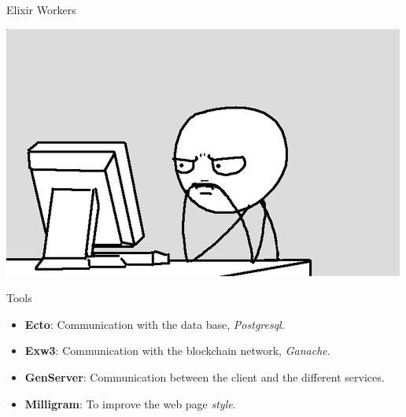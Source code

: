 \documentclass{beamer}
\begin{document}
\begin{frame}{Elixir Workers}
  \begin{center}
  \includegraphics[scale=0.5]{Images/worker.png}
  \end{center}
\end{frame}


\begin{frame}{Tools}
  \begin{itemize}
    \item \textbf{Ecto}: Communication with the data base, \textit{Postgresql}.
    \item \textbf{Exw3}: Communication with the blockchain network, \textit{Ganache}.
    \item \textbf{GenServer}: Communication between the client and the different services.
    \item \textbf{Milligram}: To improve the web page \textit{style}.
  \end{itemize}
\end{frame}
\end{document}
